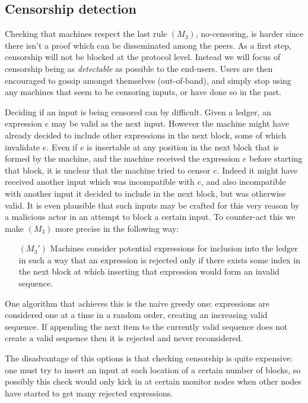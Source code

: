 \documentclass[a4paper, oneside, 10pt]{amsart}
\begin{document}
\hypertarget{censorship-detection}{%
\subsection{Censorship detection}\label{censorship-detection}}

Checking that machines respect the last rule $(M_3)$, no-censoring, is harder
since there isn't a proof which can be disseminated among the peers. As a first
step, censorship will not be blocked at the protocol level. Instead we will
focus of censorship being as \emph{detectable} as possible to the
end-users. Users are then encouraged to gossip amongst themselves (out-of-band),
and simply stop using any machines that seem to be censoring inputs, or have
done so in the past.

Deciding if an input is being censored can by difficult. Given a ledger, an
expression $e$ may be valid as the next input. However the machine might have
already decided to include other expressions in the next block, some of which
invalidate $e$. Even if $e$ is insertable at any position in the next block that
is formed by the machine, and the machine received the expression $e$ before
starting that block, it is unclear that the machine tried to censor $e$. Indeed
it might have received another input which was incompatible with $e$, and also
incompatible with another input it decided to include in the next block, but was
otherwise valid. It is even plausible that such inputs may be crafted for this
very reason by a malicious actor in an attempt to block a certain input. To
counter-act this we make $(M_3)$ more precise in the following way:
\begin{itemize}
  \item[$(M_3')$] Machines consider potential expressions for inclusion into the
    ledger in such a way that an expression is rejected only if there exists
    some index in the next block at which inserting that expression would form
    an invalid sequence.
\end{itemize}

One algorithm that achieves this is the naive greedy one: expressions are
considered one at a time in a random order, creating an increasing valid
sequence. If appending the next item to the currently valid sequence does not
create a valid sequence then it is rejected and never reconsidered.

The disadvantage of this options is that checking censorship is quite expensive:
one must try to insert an input at each location of a certain number of blocks,
so possibly this check would only kick in at certain monitor nodes when other
nodes have started to get many rejected expressions.
\end{document}
